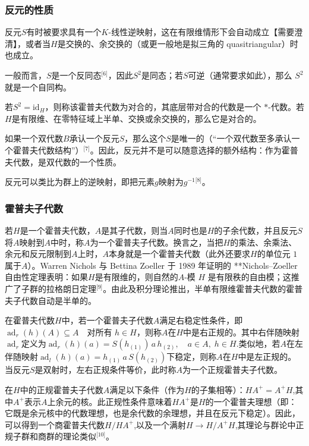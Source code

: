 \subsubsection{反元的性质}
反元$S$有时被要求具有一个$K$-线性逆映射，这在有限维情形下会自动成立【需要澄清】，或者当$H$是交换的、余交换的（或更一般地是拟三角的 quasitriangular）时也成立。

一般而言，$S$是一个反同态\(^\text{[6]}\)，因此$S^2$是同态；若$S$可逆（通常要求如此），那么 $S^2$ 就是一个自同构。

若$S^2 = \mathrm{id}_H$，则称该霍普夫代数为对合的，其底层带对合的代数是一个 $*$-代数。若$H$是有限维、在零特征域上半单、交换或余交换的，那么它是对合的。

如果一个双代数$B$承认一个反元$S$，那么这个$S$是唯一的（“一个双代数至多承认一个霍普夫代数结构”）\(^\text{[7]}\)。因此，反元并不是可以随意选择的额外结构：作为霍普夫代数，是双代数的一个性质。

反元可以类比为群上的逆映射，即把元素$g$映射为$g^{-1}$\(^\text{[8]}\)。
\subsubsection{霍普夫子代数}
若$H$是一个霍普夫代数，$A$是其子代数，则当$A$同时也是$H$的子余代数，并且反元$S$将$A$映射到$A$中时，称$A$为一个霍普夫子代数。换言之，当把$H$的乘法、余乘法、余元和反元限制到$A$上时，$A$本身就是一个霍普夫代数（此外还要求$H$的单位元 $1$属于$A$）。Warren Nichols 与 Bettina Zoeller 于 1989 年证明的 **Nichols–Zoeller 自由性定理表明：如果$H$是有限维的，则自然的$A$-模 $H$ 是有限秩的自由模；这推广了子群的拉格朗日定理\(^\text{[9]}\)。由此及积分理论推出，半单有限维霍普夫代数的霍普夫子代数自动是半单的。

在霍普夫代数$H$中，若一个霍普夫子代数$A$满足右稳定性条件，即$\operatorname{ad}_r(h)(A) \subseteq A \quad \text{对所有 } h \in H$，则称$A$在$H$中是右正规的。其中右伴随映射$\operatorname{ad}_r$定义为$\operatorname{ad}_r(h)(a) = S(h_{(1)})\, a \, h_{(2)}, \quad a \in A, \; h \in H$.类似地，若$A$在左伴随映射$\operatorname{ad}_l(h)(a) = h_{(1)}\, a \, S(h_{(2)})$下稳定，则称$A$在$H$中是左正规的。当反元$S$是双射时，左右正规条件等价，此时称$A$为一个正规霍普夫子代数。

在$H$中的正规霍普夫子代数$A$满足以下条件（作为$H$的子集相等）：$H A^{+} = A^{+} H$,其中$A^{+}$表示$A$上余元的核。此正规性条件意味着$H A^{+}$是$H$的一个霍普夫理想（即：它既是余元核中的代数理想，也是余代数的余理想，并且在反元下稳定）。因此，可以得到一个商霍普夫代数$H / H A^{+}$,以及一个满射$H \to H / A^{+} H$,其理论与群论中正规子群和商群的理论类似\(^\text{[10]}\)。
